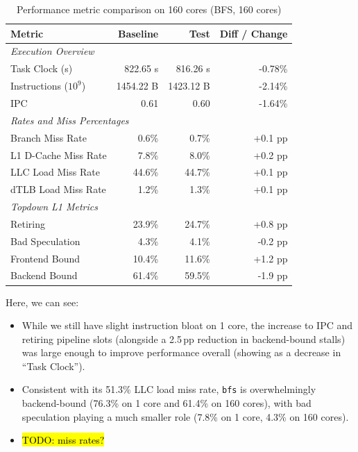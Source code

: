 \begin{table}[htbp]
  \centering
  \caption{Performance metric comparison on 160 cores (BFS, 160 cores)}
  \label{tab:perf_comparison_bfs_160cores}
  \begin{tabular}{lrrr}
    \toprule
    \textbf{Metric} & \textbf{Baseline} & \textbf{Test} & \textbf{Diff / Change} \\
    \midrule
    \multicolumn{4}{l}{\textit{Execution Overview}} \\
    \quad Task Clock (s)           & 822.65 s   & 816.26 s   & -0.78\%   \\
    \quad Instructions ($10^9$)    & 1454.22 B  & 1423.12 B  & -2.14\%   \\
    \quad IPC                      & 0.61       & 0.60       & -1.64\%   \\
    \midrule
    \multicolumn{4}{l}{\textit{Rates and Miss Percentages}} \\
    \quad Branch Miss Rate         & 0.6\%      & 0.7\%      & +0.1 pp   \\
    \quad L1 D-Cache Miss Rate     & 7.8\%      & 8.0\%      & +0.2 pp   \\
    \quad LLC Load Miss Rate       & 44.6\%     & 44.7\%     & +0.1 pp   \\
    \quad dTLB Load Miss Rate      & 1.2\%      & 1.3\%      & +0.1 pp   \\
    \midrule
    \multicolumn{4}{l}{\textit{Topdown L1 Metrics}} \\
    \quad Retiring                 & 23.9\%     & 24.7\%     & +0.8 pp   \\
    \quad Bad Speculation          & 4.3\%     & 4.1\%     & -0.2 pp   \\
    \quad Frontend Bound           & 10.4\%     & 11.6\%     & +1.2 pp   \\
    \quad Backend Bound            & 61.4\%     & 59.5\%     & -1.9 pp   \\
    \bottomrule
  \end{tabular}
\end{table}
Here, we can see:
\begin{itemize}
\item While we still have slight instruction bloat on 1 core, the increase to IPC
  and retiring pipeline slots (alongside a 2.5\,pp reduction in backend-bound
  stalls) was large enough to improve performance overall (showing as a decrease
  in ``Task Clock'').
\item Consistent with its 51.3\% LLC load miss rate, \texttt{bfs} is
  overwhelmingly backend-bound (76.3\% on 1 core and 61.4\% on 160 cores), with
  bad speculation playing a much smaller role (7.8\% on 1 core, 4.3\% on 160
  cores).
\item \hl{TODO: miss rates?}
\end{itemize}

